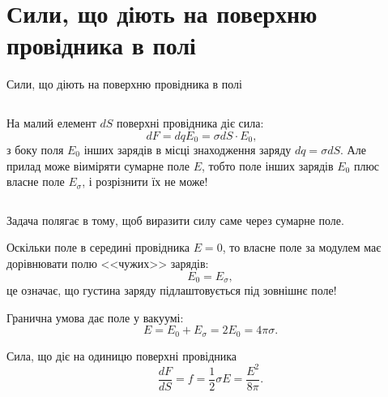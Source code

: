 \documentclass[onlytextwidth]{beamer}
\begin{document}
\section{Сили, що діють на поверхню провідника в полі}




\begin{frame}{Сили, що діють на поверхню провідника в полі}{}
	\begin{columns}
		\begin{column}{0.65\linewidth}
			\begin{block}{}\justifying
				На малий елемент $dS$ поверхні провідника діє сила:
				\begin{equation*}
					dF = dq E_0 = \sigma dS \cdot  E_0,
				\end{equation*}
				з боку \alert{поля $E_0$ інших зарядів} в місці
				знаходження заряду $dq = \sigma dS$. Але прилад може віиміряти \alert{сумарне поле
					$E$}, тобто поле  \alert{інших зарядів $E_0$} плюс \alert{власне поле
					$E_{\sigma}$}, і  розрізнити їх не може!
			\end{block}
		\end{column}
		\begin{column}{0.34\linewidth}\centering
			
		\end{column}
	\end{columns}
	\begin{overprint}
		\begin{alertblock}{}\justifying
			Задача 	полягає в тому, щоб виразити силу саме через сумарне поле.
		\end{alertblock}
		\begin{block}{}\justifying
			Оскільки поле в середині провідника  $E = 0$, то власне поле за модулем має дорівнювати
			полю <<чужих>> зарядів:
			\begin{equation*}
				E_0 = E_{\sigma},
			\end{equation*}
			це означає, що \alert{густина заряду підлаштовується під зовнішнє поле}!
		\end{block}
		\begin{block}{}\justifying
			Гранична умова дає поле у вакуумі:
			\begin{equation*}
				E = E_0 + E_{\sigma} = 2 E_0 = 4\pi\sigma.
			\end{equation*}
		\end{block}
		\begin{block}{}\justifying
			Сила, що діє на одиницю поверхні провідника
			\begin{equation*}
				\frac{dF}{dS} = f = \frac12 \sigma E = \frac{E^2}{8\pi}.
			\end{equation*}
		\end{block}
	\end{overprint}
\end{frame}
\end{document}
